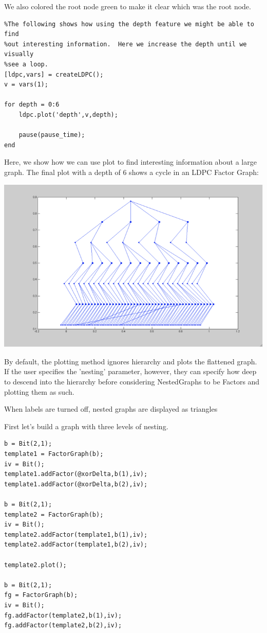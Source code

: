 We also colored the root node green to make it clear which was the root node.

\begin{lstlisting}
%The following shows how using the depth feature we might be able to find
%out interesting information.  Here we increase the depth until we visually
%see a loop.
[ldpc,vars] = createLDPC();
v = vars(1);
 
for depth = 0:6
    ldpc.plot('depth',v,depth);
    
    pause(pause_time);
end
\end{lstlisting}

Here, we show how we can use plot to find interesting information about a large graph.  The final plot with a depth of 6 shows a cycle in an LDPC Factor Graph:

\includegraphics{images/plot9.png}

 

By default, the plotting method ignores hierarchy and plots the flattened graph.  If the user specifies the 'nesting' parameter, however, they can specify how deep to descend into the hierarchy before considering NestedGraphs to be Factors and plotting them as such.

When labels are turned off, nested graphs are displayed as triangles

First let's build a graph with three levels of nesting.

\begin{lstlisting}
b = Bit(2,1);
template1 = FactorGraph(b);
iv = Bit();
template1.addFactor(@xorDelta,b(1),iv);
template1.addFactor(@xorDelta,b(2),iv);
 
b = Bit(2,1);
template2 = FactorGraph(b);
iv = Bit();
template2.addFactor(template1,b(1),iv);
template2.addFactor(template1,b(2),iv);
 
template2.plot();
 
b = Bit(2,1);
fg = FactorGraph(b);
iv = Bit();
fg.addFactor(template2,b(1),iv);
fg.addFactor(template2,b(2),iv);
\end{lstlisting}
 
